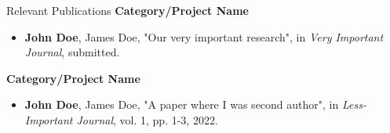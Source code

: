 \documentclass[10pt]{resume} %
\begin{document}
\vspace*{-2mm}
\begin{rSection}{Relevant Publications\hspace*{65mm} }%
	{\bf Category/Project Name}
	\begin{itemize}
		\item \textbf{John Doe}, James Doe, "Our very important research", in \textit{Very Important Journal}, submitted.
	\end{itemize}
	{\bf Category/Project Name}
	\begin{itemize}
		\item \textbf{John Doe}, James Doe, "A paper where I was second author", in \textit{Less-Important Journal}, vol. 1, pp. 1-3, 2022.
	\end{itemize}
\end{rSection}
\end{document}

